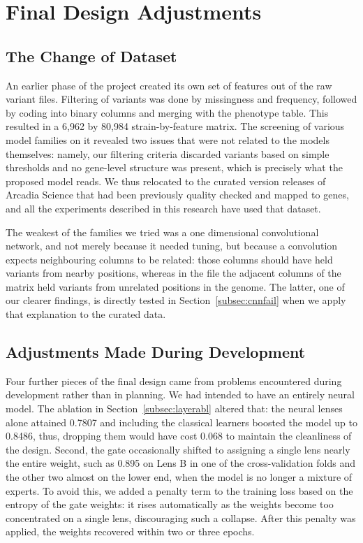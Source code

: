 \FloatBarrier
\section{Final Design Adjustments}
\label{sec:designadj}

\FloatBarrier
\subsection{The Change of Dataset}
\label{subsec:ownprep}

An earlier phase of the project created its own set of features out of the
raw variant files. Filtering of variants was done by missingness and
frequency, followed by coding into binary columns and merging with the
phenotype table. This resulted in a 6{,}962 by 80{,}984 strain-by-feature
matrix. The screening of
various model families on it revealed two issues that were not related to the
models themselves: namely, our filtering criteria discarded variants based on
simple thresholds and no gene-level structure was present, which is precisely
what the proposed model reads. We thus relocated to the curated version
releases of Arcadia Science that had been previously quality checked and
mapped to genes, and all the experiments described in this research have used
that dataset.

The weakest of the families we tried was a one dimensional convolutional
network, and not merely because it needed tuning, but because a convolution
expects neighbouring columns to be related: those columns should have held
variants from nearby positions, whereas in the file the adjacent columns of
the matrix held variants from unrelated positions in the genome. The latter, one of our clearer
findings, is directly tested in Section~\ref{subsec:cnnfail} when we apply
that explanation to the curated data.

\FloatBarrier
\subsection{Adjustments Made During Development}
\label{subsec:devadjust}

Four further pieces of the final design came from problems encountered during
development rather than in planning. We had intended to have an entirely neural model. The ablation in
Section~\ref{subsec:layerabl} altered that: the neural lenses alone attained
0.7807 and including the classical learners boosted the model up to 0.8486,
thus, dropping them would have cost 0.068 to maintain the cleanliness of the
design. Second, the gate occasionally shifted to assigning a single lens
nearly the entire weight, such as 0.895 on Lens B in one of the
cross-validation folds and the other two almost on the lower end, when the
model is no longer a mixture of experts. To avoid this, we added a penalty term to the training loss based on the
entropy of the gate weights: it rises automatically as the weights become too
concentrated on a single lens, discouraging such a collapse. After this
penalty was applied, the weights recovered within two or three epochs.

